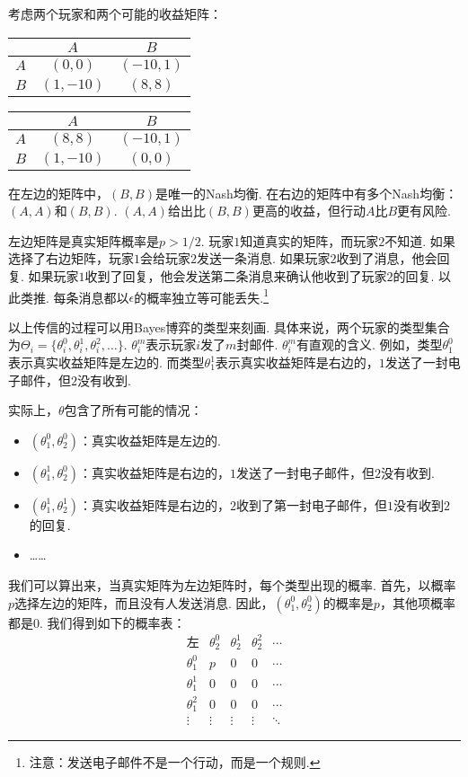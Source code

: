 考虑两个玩家和两个可能的收益矩阵：
\begin{table}[ht]
    \centering
\begin{tabular}{c|cc}
&$A$ & $B$ \\
\hline
$A$ & $(0, 0)$ & $(-10, 1)$ \\
$B$ & $(1, -10)$ & $(8, 8)$ \\
\end{tabular}
\qquad
\begin{tabular}{c|cc}
&$A$ & $B$ \\
\hline
$A$ & $(8, 8)$ & $(-10, 1)$ \\
$B$ & $(1, -10)$ & $(0, 0)$ \\
\end{tabular}
\end{table}

在左边的矩阵中，$(B,B)$是唯一的Nash均衡. 在右边的矩阵中有多个Nash均衡：$(A,A)$和$(B,B)$. $(A,A)$给出比$(B,B)$更高的收益，但行动$A$比$B$更有风险.

左边矩阵是真实矩阵概率是$p>1/2$. 玩家$1$知道真实的矩阵，而玩家$2$不知道. 如果选择了右边矩阵，玩家$1$会给玩家$2$发送一条消息. 如果玩家$2$收到了消息，他会回复. 如果玩家$1$收到了回复，他会发送第二条消息来确认他收到了玩家$2$的回复. 以此类推.  每条消息都以$\epsilon$的概率独立等可能丢失.\footnote{注意：发送电子邮件不是一个行动，而是一个规则.}  

以上传信的过程可以用Bayes博弈的类型来刻画. 具体来说，两个玩家的类型集合为$\Theta_i = \{\theta_i^0, \theta_i^1, \theta_i^2, \dots\}$. $\theta_i^m$表示玩家$i$发了$m$封邮件. $\theta_i^m$有直观的含义. 例如，类型$\theta_1^0$表示真实收益矩阵是左边的.  而类型$\theta_1^1$表示真实收益矩阵是右边的，$1$发送了一封电子邮件，但$2$没有收到. 

实际上，$\theta$包含了所有可能的情况：
\begin{itemize}
\item $(\theta_1^0, \theta_2^0)$：真实收益矩阵是左边的. 
\item $(\theta_1^1, \theta_2^0)$：真实收益矩阵是右边的，$1$发送了一封电子邮件，但$2$没有收到. 
\item $(\theta_1^1, \theta_2^1)$：真实收益矩阵是右边的，$2$收到了第一封电子邮件，但$1$没有收到$2$的回复. 
\item ……
\end{itemize}

我们可以算出来，当真实矩阵为左边矩阵时，每个类型出现的概率. 首先，以概率$p$选择左边的矩阵，而且没有人发送消息. 因此，$(\theta_1^0,\theta_2^0)$的概率是$p$，其他项概率都是$0$. 我们得到如下的概率表：
\[\begin{array}{c|cccc}
\text{左}& \theta_2^0 & \theta_2^1 & \theta_2^2 & \cdots \\
\hline
\theta_1^0 & p & 0 & 0 & \cdots \\
\theta_1^1 & 0 & 0 & 0 & \cdots \\
\theta_1^2 & 0 & 0 & 0 & \cdots \\
\vdots & \vdots & \vdots & \vdots & \ddots
\end{array}
\]


